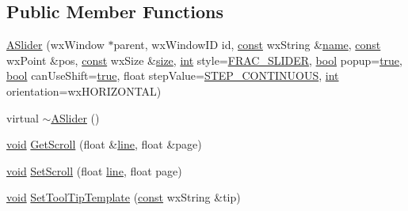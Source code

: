 \subsection*{Public Member Functions}
\begin{DoxyCompactItemize}
\item 
\hyperlink{class_a_slider_a17f459f4dd5ca177b94a099a37250b1e}{A\+Slider} (wx\+Window $\ast$parent, wx\+Window\+ID id, \hyperlink{getopt1_8c_a2c212835823e3c54a8ab6d95c652660e}{const} wx\+String \&\hyperlink{lib_2expat_8h_a1b49b495b59f9e73205b69ad1a2965b0}{name}, \hyperlink{getopt1_8c_a2c212835823e3c54a8ab6d95c652660e}{const} wx\+Point \&pos, \hyperlink{getopt1_8c_a2c212835823e3c54a8ab6d95c652660e}{const} wx\+Size \&\hyperlink{group__lavu__mem_ga854352f53b148adc24983a58a1866d66}{size}, \hyperlink{xmltok_8h_a5a0d4a5641ce434f1d23533f2b2e6653}{int} style=\hyperlink{_a_slider_8h_a499734eb1058aff0b262a6c7a7464eee}{F\+R\+A\+C\+\_\+\+S\+L\+I\+D\+ER}, \hyperlink{mac_2config_2i386_2lib-src_2libsoxr_2soxr-config_8h_abb452686968e48b67397da5f97445f5b}{bool} popup=\hyperlink{mac_2config_2i386_2lib-src_2libsoxr_2soxr-config_8h_a41f9c5fb8b08eb5dc3edce4dcb37fee7}{true}, \hyperlink{mac_2config_2i386_2lib-src_2libsoxr_2soxr-config_8h_abb452686968e48b67397da5f97445f5b}{bool} can\+Use\+Shift=\hyperlink{mac_2config_2i386_2lib-src_2libsoxr_2soxr-config_8h_a41f9c5fb8b08eb5dc3edce4dcb37fee7}{true}, float step\+Value=\hyperlink{_a_slider_8h_a5a134b38508842241d79758ee7f69ae3}{S\+T\+E\+P\+\_\+\+C\+O\+N\+T\+I\+N\+U\+O\+US}, \hyperlink{xmltok_8h_a5a0d4a5641ce434f1d23533f2b2e6653}{int} orientation=wx\+H\+O\+R\+I\+Z\+O\+N\+T\+AL)
\item 
virtual \hyperlink{class_a_slider_aa683d6f3f9614824505b7d9d4d03b6ad}{$\sim$\+A\+Slider} ()
\item 
\hyperlink{sound_8c_ae35f5844602719cf66324f4de2a658b3}{void} \hyperlink{class_a_slider_a5720cef94525348d3e054e0d5ff76913}{Get\+Scroll} (float \&\hyperlink{seqread_8c_aad9ebcdde542d8b2075615388ff15a9c}{line}, float \&page)
\item 
\hyperlink{sound_8c_ae35f5844602719cf66324f4de2a658b3}{void} \hyperlink{class_a_slider_af94f9281b63b05c1e8896e89a129a2bd}{Set\+Scroll} (float \hyperlink{seqread_8c_aad9ebcdde542d8b2075615388ff15a9c}{line}, float page)
\item 
\hyperlink{sound_8c_ae35f5844602719cf66324f4de2a658b3}{void} \hyperlink{class_a_slider_a24c16a85b48498e22493ef6e2970b89f}{Set\+Tool\+Tip\+Template} (\hyperlink{getopt1_8c_a2c212835823e3c54a8ab6d95c652660e}{const} wx\+String \&tip)
\item 

\end{DoxyCompactItemize}
